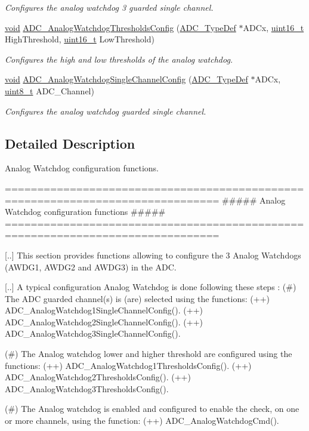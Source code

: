 \begin{DoxyCompactItemize}
\begin{DoxyCompactList}\small\item\em Configures the analog watchdog 3 guarded single channel. \end{DoxyCompactList}\item 
\hyperlink{group___n_a_m_e_ga18028b8badbf1ea7e704ccac3c488e82}{void} \hyperlink{group___a_d_c___group2_ga79588d02aa8e4147f21cb90a4708366d}{A\-D\-C\-\_\-\-Analog\-Watchdog\-Thresholds\-Config} (\hyperlink{struct_a_d_c___type_def}{A\-D\-C\-\_\-\-Type\-Def} $\ast$A\-D\-Cx, \hyperlink{stdint_8h_a273cf69d639a59973b6019625df33e30}{uint16\-\_\-t} High\-Threshold, \hyperlink{stdint_8h_a273cf69d639a59973b6019625df33e30}{uint16\-\_\-t} Low\-Threshold)
\begin{DoxyCompactList}\small\item\em Configures the high and low thresholds of the analog watchdog. \end{DoxyCompactList}\item 
\hyperlink{group___n_a_m_e_ga18028b8badbf1ea7e704ccac3c488e82}{void} \hyperlink{group___a_d_c___group2_ga03cef3d12292ffa2b8520524d5b0226c}{A\-D\-C\-\_\-\-Analog\-Watchdog\-Single\-Channel\-Config} (\hyperlink{struct_a_d_c___type_def}{A\-D\-C\-\_\-\-Type\-Def} $\ast$A\-D\-Cx, \hyperlink{stdint_8h_aba7bc1797add20fe3efdf37ced1182c5}{uint8\-\_\-t} A\-D\-C\-\_\-\-Channel)
\begin{DoxyCompactList}\small\item\em Configures the analog watchdog guarded single channel. \end{DoxyCompactList}\end{DoxyCompactItemize}


\subsection{Detailed Description}
Analog Watchdog configuration functions. \begin{DoxyVerb} ===============================================================================
                    ##### Analog Watchdog configuration functions #####
 ===============================================================================  

  [..] This section provides functions allowing to configure the 3 Analog Watchdogs 
       (AWDG1, AWDG2 and AWDG3) in the ADC.
  
  [..] A typical configuration Analog Watchdog is done following these steps :
   (#) The ADC guarded channel(s) is (are) selected using the functions: 
      (++) ADC_AnalogWatchdog1SingleChannelConfig().
      (++) ADC_AnalogWatchdog2SingleChannelConfig().
      (++) ADC_AnalogWatchdog3SingleChannelConfig().

   (#) The Analog watchdog lower and higher threshold are configured using the functions: 
      (++) ADC_AnalogWatchdog1ThresholdsConfig().
      (++) ADC_AnalogWatchdog2ThresholdsConfig().
      (++) ADC_AnalogWatchdog3ThresholdsConfig().

   (#) The Analog watchdog is enabled and configured to enable the check, on one
      or more channels, using the function:
      (++) ADC_AnalogWatchdogCmd().\end{DoxyVerb}


